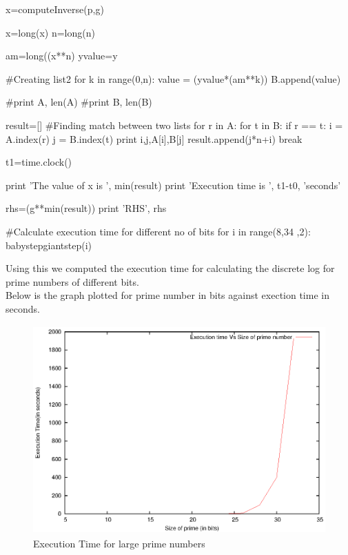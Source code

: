 \documentclass{article}
\begin{document}
\begin{python}
    x=computeInverse(p,g)

    x=long(x)
    n=long(n)

    am=long((x**n) %
    yvalue=y

    #Creating list2
    for k in range(0,n):
        value = (yvalue*(am**k)) %
        B.append(value)

    #print A, len(A)
    #print B, len(B)

    result=[]
    #Finding match between two lists
    for r in A:
        for t in B:
            if r == t:
                i = A.index(r)            
                j = B.index(t)
                print i,j,A[i],B[j]
                result.append(j*n+i)
                break

    t1=time.clock() 
           
    print 'The value of x is ', min(result) 
    print 'Execution time is ', t1-t0, 'seconds' 



    rhs=(g**min(result)) %
    print 'RHS', rhs


#Calculate execution time for different no of bits
for i in range(8,34 ,2):
    babystepgiantstep(i)
\end{python}

\vspace{70px}
\noindent Using this we computed the execution time for calculating the discrete log for prime numbers of different bits. \\

\noindent Below is the graph plotted for prime number in bits against exection time in seconds. \\

\begin{figure}[htb]
		\includegraphics[width=15cm,height=8cm]{bsgsGraph}
		\caption{Execution Time for large prime numbers}
\end{figure}
\end{document}
